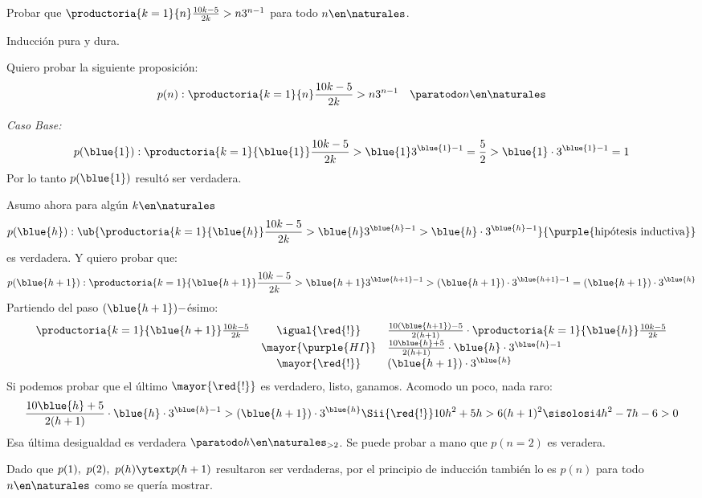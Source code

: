 \begin{enunciado}{\ejExtra}
  Probar que $\productoria{k=1}{n}\frac{10k - 5}{2k} > n 3^{n-1}$ para todo $n \en \naturales$.
\end{enunciado}

Inducción pura y dura.

\bigskip

Quiero probar la siguiente proposición:
$$
  p(n) :
  \productoria{k=1}{n}\frac{10k - 5}{2k} > n 3^{n-1} \quad \paratodo n \en \naturales
$$

\textit{Caso Base:}
$$
  p(\blue{1}) :
  \productoria{k=1}{\blue{1}}\frac{10k - 5}{2k} > \blue{1} 3^{\blue{1}-1}  = \frac{5}{2} > \blue{1} \cdot 3^{\blue{1} - 1} = 1
$$
Por lo tanto $p(\blue{1})$ resultó ser verdadera.

\medskip

Asumo ahora para algún $k \en \naturales$
$$
  p(\blue{h}) :
  \ub{\productoria{k=1}{\blue{h}}\frac{10k - 5}{2k} > \blue{h} 3^{\blue{h}-1}
    >
    \blue{h} \cdot 3^{\blue{h} - 1}}{\text{\purple{hipótesis inductiva}}}
$$
es verdadera. Y quiero probar que:
$$
  p(\blue{h+1}) : \productoria{k=1}{\blue{h+1}}\frac{10k - 5}{2k} > \blue{h+1} 3^{\blue{h+1}-1}
  >
  (\blue{h+1}) \cdot 3^{\blue{h+1} - 1} =
  (\blue{h+1}) \cdot 3^{\blue{h}}
$$
Partiendo del paso $(\blue{h + 1})-$ésimo:
$$
  \begin{array}{rcl}
    \productoria{k=1}{\blue{h+1}}\frac{10k - 5}{2k}
     & \igual{\red{!}}     &
    \frac{10(\blue{h+1}) - 5}{2(h+1)} \cdot
    \productoria{k=1}{\blue{h}}\frac{10k - 5}{2k}                    \\
     & \mayor{\purple{HI}} &
    \frac{10\blue{h} + 5}{2(h+1)} \cdot \blue{h}\cdot 3^{\blue{h}-1} \\
     & \mayor{\red{!}}     &
    (\blue{h+1}) \cdot 3^{\blue{h}}
  \end{array}
$$
Si podemos probar que el último $\mayor{\red{!}}$ es verdadero, listo, ganamos. Acomodo un poco, nada raro:
$$
  \frac{10\blue{h} + 5}{2(h+1)} \cdot \blue{h}\cdot 3^{\blue{h}-1}
  >
  (\blue{h+1}) \cdot 3^{\blue{h}}
  \Sii{\red{!}}
  10h^2 + 5h > 6(h+1)^2
  \sisolosi
  4h^2 - 7h -6 > 0
$$
Esa última desigualdad es verdadera $ \paratodo h\en \naturales_{>2}$. Se puede probar a mano que $p(n = 2)$ es veradera.

\bigskip

Dado que $p(1),~ p(2),~ p(h) \ytext p(h+1)$ resultaron ser verdaderas, por el principio de inducción también lo es $p(n)$ para todo $n \en \naturales$ como se
quería mostrar.

\begin{aportes}
  \item {}
\end{aportes}
